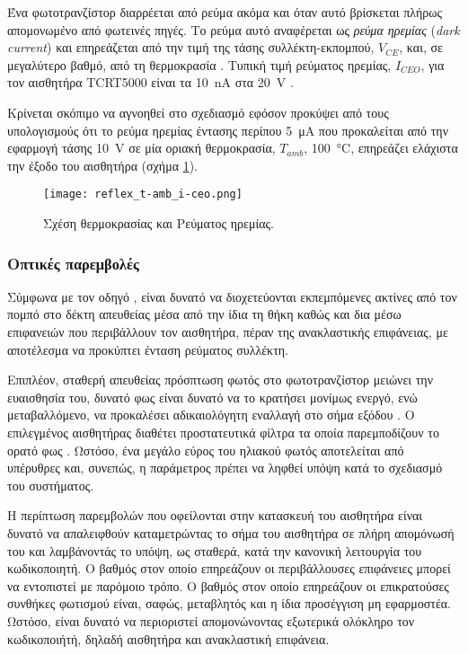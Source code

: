 Ένα φωτοτρανζίστορ διαρρέεται από ρεύμα ακόμα και όταν αυτό βρίσκεται πλήρως
απομονωμένο από φωτεινές πηγές. Το ρεύμα αυτό αναφέρεται ως \emph{ρεύμα ηρεμίας}
 (\emph{dark current}) και επηρεάζεται από την τιμή της
τάσης συλλέκτη-εκπομπού, $V_{CE}$, και, σε μεγαλύτερο βαθμό, από τη θερμοκρασία
\parencite{vishay06}. Τυπική τιμή ρεύματος ηρεμίας, $I_{CEO}$, για τον αισθητήρα
TCRT5000 είναι τα 10~nA στα 20~V \parencite{vishay09}.

Κρίνεται σκόπιμο να αγνοηθεί στο σχεδιασμό εφόσον προκύψει από τους υπολογισμούς
ότι το ρεύμα ηρεμίας έντασης περίπου 5~μA που προκαλείται από την εφαρμογή
τάσης 10~V σε μία οριακή θερμοκρασία, $T_{amb}$, 100~°C, επηρεάζει ελάχιστα την
έξοδο του αισθητήρα (σχήμα \ref{fig:reflex:t-amb_i-ceo}).

\begin{figure}
    \caption{Σχέση θερμοκρασίας και Ρεύματος ηρεμίας.
    \label{fig:reflex:t-amb_i-ceo}}
    \begin{center}%
    \texttt{[image: reflex\_t-amb\_i-ceo.png]}
    \end{center}

\end{figure}

\subsubsection{Οπτικές παρεμβολές}

Σύμφωνα με τον οδηγό \textcite{vishay06}, είναι δυνατό να διοχετεύονται
εκπεμπόμενες ακτίνες από τον πομπό στο δέκτη απευθείας μέσα από την ίδια τη θήκη
καθώς και δια μέσω επιφανειών που περιβάλλουν τον αισθητήρα, πέραν της
ανακλαστικής επιφάνειας, με αποτέλεσμα να προκύπτει ένταση ρεύματος συλλέκτη.

Επιπλέον, σταθερή απευθείας πρόσπτωση φωτός στο φωτοτρανζίστορ μειώνει την
ευαισθησία του, δυνατό φως είναι δυνατό να το κρατήσει μονίμως ενεργό, ενώ
μεταβαλλόμενο, να προκαλέσει αδικαιολόγητη εναλλαγή στο σήμα εξόδου
\parencite{vishay06}.
Ο επιλεγμένος αισθητήρας διαθέτει προστατευτικά φίλτρα τα οποία παρεμποδίζουν το
ορατό φως \parencite{vishay09}. Ωστόσο, ένα μεγάλο εύρος του ηλιακού φωτός
αποτελείται από υπέρυθρες και, συνεπώς, η παράμετρος πρέπει να ληφθεί υπόψη κατά
το σχεδιασμό του συστήματος.

Η περίπτωση παρεμβολών που οφείλονται στην κατασκευή του αισθητήρα είναι δυνατό
να απαλειφθούν καταμετρώντας το σήμα του αισθητήρα σε πλήρη απομόνωσή του και
λαμβάνοντάς το υπόψη, ως σταθερά, κατά την κανονική λειτουργία του κωδικοποιητή.
Ο βαθμός στον οποίο επηρεάζουν οι περιβάλλουσες επιφάνειες μπορεί να εντοπιστεί
με παρόμοιο τρόπο. Ο βαθμός στον οποίο επηρεάζουν οι επικρατούσες συνθήκες
φωτισμού είναι, σαφώς, μεταβλητός και η ίδια προσέγγιση μη εφαρμοστέα. Ωστόσο,
είναι δυνατό να περιοριστεί απομονώνοντας εξωτερικά ολόκληρο τον κωδικοποιήτή,
δηλαδή αισθητήρα και ανακλαστική επιφάνεια.

